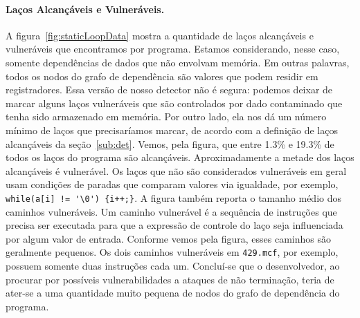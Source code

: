 \documentclass{llncs}
\begin{document}
\paragraph{Laços Alcançáveis e Vulneráveis. }
A figura~\ref{fig:staticLoopData} mostra a quantidade de laços alcançáveis e
vulneráveis que encontramos por programa.
Estamos considerando, nesse caso, somente dependências de dados que não
envolvam memória.
Em outras palavras, todos os nodos do grafo de dependência são valores que
podem residir em registradores.
Essa versão de nosso detector não é segura: podemos deixar de marcar alguns
laços vulneráveis que são controlados por dado contaminado que tenha sido
armazenado em memória.
Por outro lado, ela nos dá um número mínimo de laços que precisaríamos marcar,
de acordo com a definição de laços alcançáveis da seção~\ref{sub:det}.
Vemos, pela figura, que entre 1.3\% e 19.3\% de todos os laços do programa
são alcançáveis.
Aproximadamente a metade dos laços alcançáveis é vulnerável.
Os laços que não são considerados vulneráveis em geral usam condições de
paradas que comparam valores via igualdade, por exemplo,
\verb^while(a[i] != '\0') {i++;}^.
A figura também reporta o tamanho médio dos caminhos vulneráveis.
Um caminho vulnerável é a sequência de instruções que precisa ser executada
para que a expressão de controle do laço seja influenciada por algum valor de
entrada.
Conforme vemos pela figura, esses caminhos são geralmente pequenos.
Os dois caminhos vulneráveis em \texttt{429.mcf}, por exemplo, possuem somente
duas instruções cada um.
Concluí-se que o desenvolvedor, ao procurar por possíveis vulnerabilidades
a ataques de não terminação, teria de ater-se a uma quantidade muito pequena
de nodos do grafo de dependência do programa.
\end{document}
